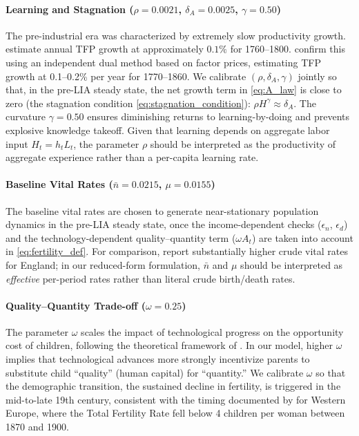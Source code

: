 \documentclass[11pt,a4paper]{article}
\begin{document}
\paragraph{Learning and Stagnation (\(\rho = 0.0021\), \(\delta_A = 0.0025\), \(\gamma = 0.50\))}
The pre-industrial era was characterized by extremely slow productivity growth. \textcite{CraftsHarley1992} estimate annual TFP growth at approximately \(0.1\%\) for 1760--1800. \textcite{AntrasVoth2003} confirm this using an independent dual method based on factor prices, estimating TFP growth at 0.1--0.2\% per year for 1770--1860. We calibrate \((\rho,\delta_A,\gamma)\) jointly so that, in the pre-LIA steady state, the net growth term in \eqref{eq:A_law} is close to zero (the stagnation condition \eqref{eq:stagnation_condition}): \(\rho H^\gamma \approx \delta_A\). The curvature \(\gamma = 0.50\) ensures diminishing returns to learning-by-doing and prevents explosive knowledge takeoff. Given that learning depends on aggregate labor input \(H_t=h_t L_t\), the parameter \(\rho\) should be interpreted as the productivity of aggregate experience rather than a per-capita learning rate.

\paragraph{Baseline Vital Rates (\(\bar{n} = 0.0215\), \(\mu = 0.0155\))}
The baseline vital rates are chosen to generate near-stationary population dynamics in the pre-LIA steady state, once the income-dependent checks (\(\epsilon_n\), \(\epsilon_d\)) and the technology-dependent quality--quantity term (\(\omega A_t\)) are taken into account in \eqref{eq:fertility_def}. For comparison, \textcite{WrigleySchofield1981} report substantially higher crude vital rates for England; in our reduced-form formulation, \(\bar{n}\) and \(\mu\) should be interpreted as \textit{effective} per-period rates rather than literal crude birth/death rates.

\paragraph{Quality--Quantity Trade-off (\(\omega = 0.25\))}
The parameter \(\omega\) scales the impact of technological progress on the opportunity cost of children, following the theoretical framework of \textcite{GalorWeil2000}. In our model, higher \(\omega\) implies that technological advances more strongly incentivize parents to substitute child ``quality'' (human capital) for ``quantity.'' We calibrate \(\omega\) so that the demographic transition, the sustained decline in fertility, is triggered in the mid-to-late 19th century, consistent with the timing documented by \textcite{CoaleWatkins1986} for Western Europe, where the Total Fertility Rate fell below 4 children per woman between 1870 and 1900.
\end{document}
